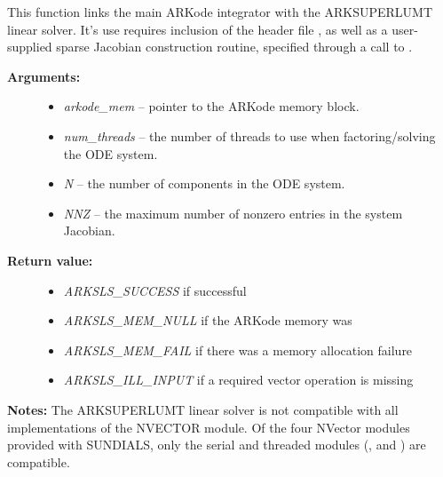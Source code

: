 \documentclass[letterpaper,10pt,english]{sphinxmanual}
\begin{document}

\begin{fulllineitems}
\label{c_interface/User_callable:c.ARKSuperLUMT}
This function links the main ARKode integrator with the ARKSUPERLUMT
linear solver.  It's use requires inclusion of the header file
, as well as a user-supplied sparse Jacobian
construction routine, specified through a call to
{\hyperref[c_interface/User_callable:c.ARKSlsSetSparseJacFn]{\emph{}}}.
\begin{description}
\item[{\textbf{Arguments:}}] \leavevmode\begin{itemize}
\item {} 
\emph{arkode\_mem} -- pointer to the ARKode memory block.

\item {} 
\emph{num\_threads} -- the number of threads to use when
factoring/solving the ODE system.

\item {} 
\emph{N} -- the number of components in the ODE system.

\item {} 
\emph{NNZ} -- the maximum number of nonzero entries in the system
Jacobian.

\end{itemize}

\item[{\textbf{Return value:}}] \leavevmode\begin{itemize}
\item {} 
\emph{ARKSLS\_SUCCESS}   if successful

\item {} 
\emph{ARKSLS\_MEM\_NULL}  if the ARKode memory was 

\item {} 
\emph{ARKSLS\_MEM\_FAIL}  if there was a memory allocation failure

\item {} 
\emph{ARKSLS\_ILL\_INPUT} if a required vector operation is missing

\end{itemize}

\end{description}

\textbf{Notes:}  The ARKSUPERLUMT linear solver is not compatible with
all implementations of the NVECTOR module.  Of the four NVector
modules provided with SUNDIALS, only the serial and threaded
modules ({\hyperref[nvectors/NVector_Serial:nvectors-nvserial]{\emph{}}}, {\hyperref[nvectors/NVector_OpenMP:nvectors-openmp]{\emph{}}} and
{\hyperref[nvectors/NVector_Pthreads:nvectors-pthreads]{\emph{}}}) are compatible.

\end{fulllineitems}
\end{document}
